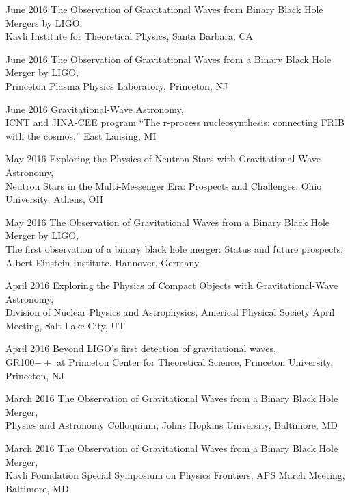 \documentclass{cv}
\begin{document}
\begin{entry}
\item[June 2016] {The Observation of Gravitational Waves from Binary Black Hole Mergers by LIGO},\\
{\small Kavli Institute for Theoretical Physics, Santa Barbara, CA}

\item[June 2016] {The Observation of Gravitational Waves from a Binary Black Hole Merger by LIGO},\\
{\small Princeton Plasma Physics Laboratory, Princeton, NJ}

\item[June 2016] {Gravitational-Wave Astronomy},\\
{\small ICNT and JINA-CEE program ``The r-process nucleosynthesis: connecting FRIB with the cosmos,'' East Lansing, MI}

\item[May 2016] {Exploring the Physics of Neutron Stars with Gravitational-Wave Astronomy},\\
{\small Neutron Stars in the Multi-Messenger Era: Prospects and Challenges, Ohio University, Athens, OH}

\item[May 2016] {The Observation of Gravitational Waves from a Binary Black Hole Merger by LIGO},\\
{\small The first observation of a binary black hole merger: Status and future prospects, Albert Einstein Institute, Hannover, Germany}

\item[April 2016] {Exploring the Physics of Compact Objects with 
Gravitational-Wave Astronomy},\\
 {\small Division of Nuclear Physics and Astrophysics, Americal Physical Society April Meeting, Salt Lake City, UT}

\item[April 2016] {Beyond LIGO's first detection of gravitational waves},\\
{\small GR100$++$ at Princeton Center for Theoretical Science, Princeton
University, Princeton, NJ}

\item[March 2016] {The Observation of Gravitational Waves from a Binary Black Hole Merger},\\
{\small Physics and Astronomy Colloquium, Johns Hopkins University, 
Baltimore, MD}

\item[March 2016] {The Observation of Gravitational Waves from a Binary Black Hole Merger},\\
{\small Kavli Foundation Special Symposium on Physics Frontiers, APS March
Meeting, Baltimore, MD}


\end{entry}
\end{document}
